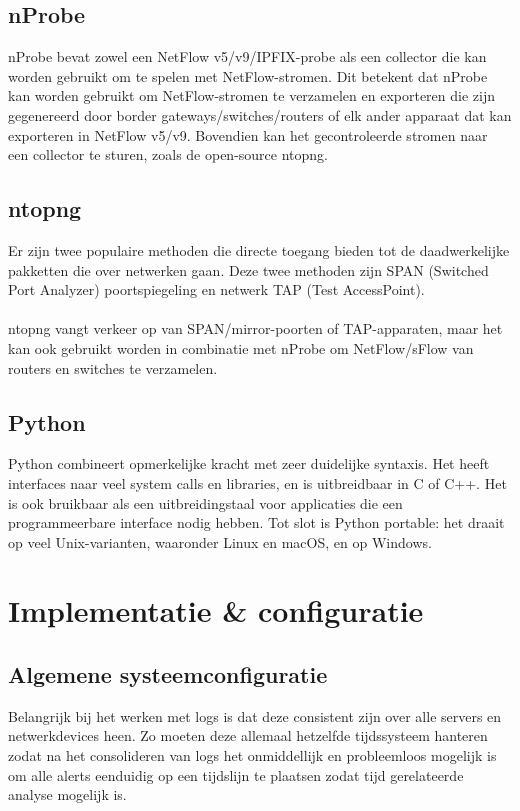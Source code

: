 \subsection{nProbe}
nProbe bevat zowel een NetFlow v5/v9/IPFIX-probe als een collector die kan worden gebruikt om te spelen met NetFlow-stromen. Dit betekent dat nProbe kan worden gebruikt om NetFlow-stromen te verzamelen en exporteren die zijn gegenereerd door border gateways/switches/routers of elk ander apparaat dat kan exporteren in NetFlow v5/v9. Bovendien kan het gecontroleerde stromen naar een collector te sturen, zoals de open-source ntopng.~\autocite{ntop2025}

\subsection{ntopng}
Er zijn twee populaire methoden die directe toegang bieden tot de daadwerkelijke pakketten die over netwerken gaan. Deze twee methoden zijn SPAN (Switched Port Analyzer) poortspiegeling en netwerk TAP (Test AccessPoint).~\autocite{ntop2025a}

\paragraph{}
ntopng vangt verkeer op van SPAN/mirror-poorten of TAP-apparaten, maar het kan ook gebruikt worden in combinatie met nProbe om NetFlow/sFlow van routers en switches te verzamelen.~\autocite{ntop2025a}

\subsection{Python}
Python combineert opmerkelijke kracht met zeer duidelijke syntaxis. Het heeft interfaces naar veel system calls en libraries, en is uitbreidbaar in C of C++. Het is ook bruikbaar als een uitbreidingstaal voor applicaties die een programmeerbare interface nodig hebben. Tot slot is Python portable: het draait op veel Unix-varianten, waaronder Linux en macOS, en op Windows.~\autocite{PythonSoftwareFoundation2025}

\section{Implementatie \& configuratie}
\subsection{Algemene systeemconfiguratie}
Belangrijk bij het werken met logs is dat deze consistent zijn over alle servers en netwerkdevices heen. Zo moeten deze allemaal hetzelfde tijdssysteem hanteren zodat na het consolideren van logs het onmiddellijk en probleemloos mogelijk is om alle alerts eenduidig op een tijdslijn te plaatsen zodat tijd gerelateerde analyse mogelijk is.

